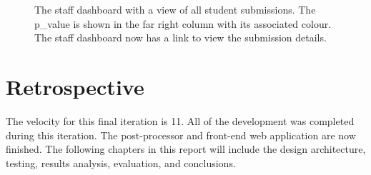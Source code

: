 \begin{figure}[H]
  \centering
  \caption[Web Staff Dashboard All Submissions]{The staff dashboard with a view of all student submissions. The p\_value is shown in the far right column with its associated colour. The staff dashboard now has a link to view the submission details.}
  \label{fig:web-all-submissions}
\end{figure}

\section{Retrospective}
The velocity for this final iteration is 11. All of the development was completed during this iteration. The post-processor and front-end web application are now finished. The following chapters in this report will include the design architecture, testing, results analysis, evaluation, and conclusions.
